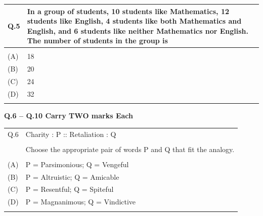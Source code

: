 \documentclass[12pt,a4paper]{article}
\begin{document}
\newpage

\begin{tabular}{|p{1cm}|p{12cm}|}
\hline
Q.5 & In a group of students, 10 students like Mathematics, 12 students like English, 4 students like both Mathematics and English, and 6 students like neither Mathematics nor English. The number of students in the group is \underline{\hspace{1cm}} \\
\hline
& \rule{0pt}{0.8cm} \\
\hline
(A) & 18 \\
\hline
(B) & 20 \\
\hline
(C) & 24 \\
\hline
(D) & 32 \\
\hline
& \rule{0pt}{0.8cm} \\
\hline
\end{tabular}

\newpage

\textbf{Q.6 -- Q.10 Carry TWO marks Each}

\vspace{0.5em}

\begin{tabular}{|p{1cm}|p{12cm}|}
\hline
Q.6 & Charity : P :: Retaliation : Q \\
    & \\
    & Choose the appropriate pair of words P and Q that fit the analogy. \\
\hline
& \rule{0pt}{0.8cm} \\
\hline
(A) & P = Parsimonious; Q = Vengeful \\
\hline
(B) & P = Altruistic; Q = Amicable \\
\hline
(C) & P = Resentful; Q = Spiteful \\
\hline
(D) & P = Magnanimous; Q = Vindictive \\
\hline
& \rule{0pt}{8cm} \\
\hline
\end{tabular}

\newpage
\end{document}
